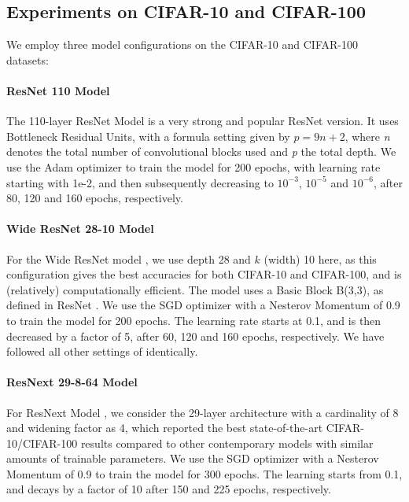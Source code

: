\documentclass{article}
\begin{document}
\subsection{Experiments on CIFAR-10 and CIFAR-100}
We employ three model configurations on the CIFAR-10 and CIFAR-100 datasets:

\vspace{-0.8em}
 \paragraph{ResNet 110 Model \cite{he2016deep}}
The 110-layer ResNet Model \cite{he2016deep} is a very strong and popular ResNet version. It uses Bottleneck Residual Units, with a formula setting given by $p = 9n + 2$, where \textit{n} denotes the total number of convolutional blocks used and \textit{p} the total depth. We use the Adam optimizer to train the model for 200 epochs, with learning rate starting with 1e-2, and then subsequently decreasing to $10^{-3}$, $10^{-5}$ and $10^{-6}$, after 80, 120 and 160 epochs, respectively.

\vspace{-0.8em}
\paragraph{Wide ResNet 28-10 Model \cite{zagoruyko2016wide}}
For the Wide ResNet model \cite{zagoruyko2016wide}, we use depth 28 and $k$ (width) 10 here, as this configuration gives the best accuracies for both CIFAR-10 and CIFAR-100, and is (relatively) computationally efficient. The model uses a Basic Block B(3,3), as defined in ResNet \cite{he2016deep}. We use the SGD optimizer with a Nesterov Momentum of 0.9 to train the model for 200 epochs. The learning rate starts at 0.1, and is then decreased by a factor of 5, after 60, 120 and 160 epochs, respectively. We have followed all other settings of \cite{zagoruyko2016wide} identically.

\vspace{-0.8em}
\paragraph{ResNext 29-8-64 Model \cite{xie2017aggregated}}
For ResNext Model \cite{xie2017aggregated}, we consider the 29-layer architecture with a cardinality of 8 and widening factor as 4, which reported the best state-of-the-art CIFAR-10/CIFAR-100 results compared to other contemporary models with similar amounts of trainable parameters. We use the SGD optimizer with a Nesterov Momentum of 0.9 to train the model for 300 epochs. The learning starts from 0.1, and decays by a factor of 10 after 150 and 225 epochs, respectively.
\end{document}
